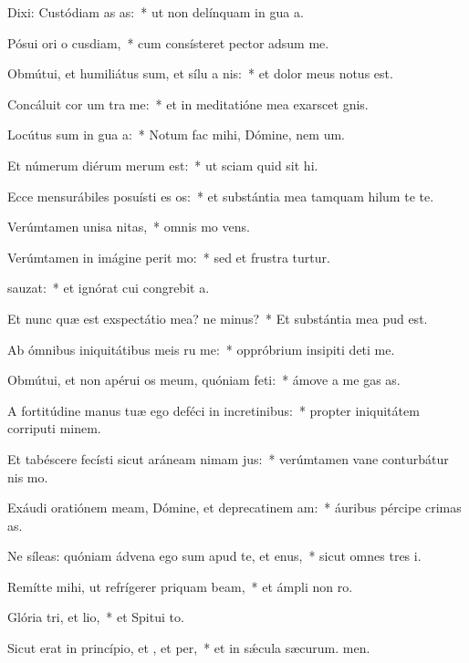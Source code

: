 \item Dixi: Custódiam as as:~* ut non delínquam in gua a.
\item Pósui ori o cusdiam,~* cum consísteret pector adsum me.
\item Obmútui, et humiliátus sum, et sílu a nis:~* et dolor meus notus est.
\item Concáluit cor um tra me:~* et in meditatióne mea exarscet gnis.
\item Locútus sum in gua a:~* Notum fac mihi, Dómine, nem um.
\item Et númerum diérum merum  est:~* ut sciam quid sit hi.
\item Ecce mensurábiles posuísti es os:~* et substántia mea tamquam hilum te te.
\item Verúmtamen unisa nitas,~* omnis mo vens.
\item Verúmtamen in imágine perit mo:~* sed et frustra turtur.
\item {}sauzat:~* et ignórat cui congrebit a.
\item Et nunc quæ est exspectátio mea? ne minus?~* Et substántia mea pud  est.
\item Ab ómnibus iniquitátibus meis ru me:~* oppróbrium insipiti deti me.
\item Obmútui, et non apérui os meum, quóniam  feti:~* ámove a me gas as.
\item A fortitúdine manus tuæ ego deféci in incretinibus:~* propter iniquitátem corriputi minem.
\item Et tabéscere fecísti sicut aráneam nimam jus:~* verúmtamen vane conturbátur nis mo.
\item Exáudi oratiónem meam, Dómine, et deprecatinem am:~* áuribus pércipe crimas as.
\item Ne síleas: quóniam ádvena ego sum apud te, et enus,~* sicut omnes tres i.
\item Remítte mihi, ut refrígerer priquam beam,~* et ámpli non ro.
\item Glória tri, et lio,~* et Spitui to.
\item Sicut erat in princípio, et , et per,~* et in sǽcula sæcurum. men.
